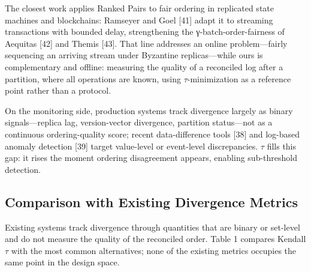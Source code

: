 \documentclass[10pt,twocolumn]{article}
\begin{document}
The closest work applies Ranked Pairs to fair ordering in replicated state machines and blockchains: Ramseyer and Goel [41] adapt it to streaming transactions with bounded delay, strengthening the γ-batch-order-fairness of Aequitas [42] and Themis [43]. That line addresses an online problem—fairly sequencing an arriving stream under Byzantine replicas—while ours is complementary and offline: measuring the quality of a reconciled log after a partition, where all operations are known, using $\tau$-minimization as a reference point rather than a protocol.

On the monitoring side, production systems track divergence largely as binary signals—replica lag, version-vector divergence, partition status—not as a continuous ordering-quality score; recent data-difference tools [38] and log-based anomaly detection [39] target value-level or event-level discrepancies. $\tau$ fills this gap: it rises the moment ordering disagreement appears, enabling sub-threshold detection.

\subsection{Comparison with Existing Divergence Metrics}
Existing systems track divergence through quantities that are binary or set-level and do not measure the quality of the reconciled order. Table 1 compares Kendall $\tau$ with the most common alternatives; none of the existing metrics occupies the same point in the design space.
\end{document}
